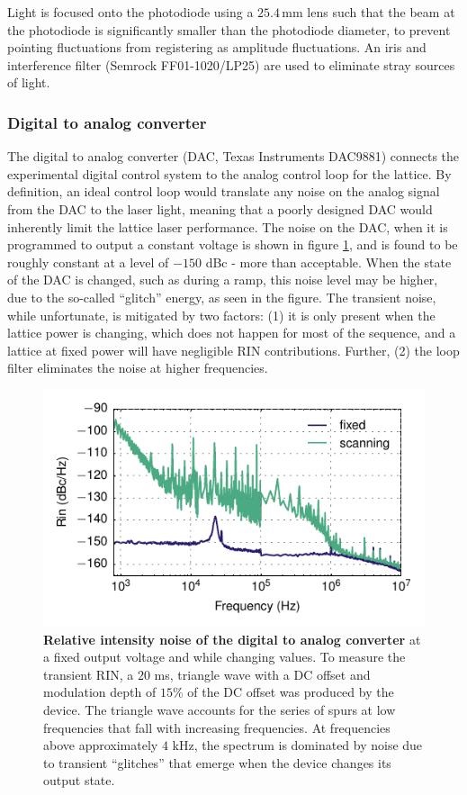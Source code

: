 \documentclass[twocolumn,aps,pra,showpacs,preprintnumbers,bibnotes]{revtex4-1}
\begin{document}
Light is focused onto the photodiode using a $25.4\,$mm lens such that the beam at the photodiode is significantly smaller than the photodiode diameter, to prevent pointing fluctuations from registering as amplitude fluctuations. 
An iris and interference filter (Semrock FF01-1020/LP25) are used to eliminate stray sources of light. 


\subsubsection{Digital to analog converter}
The digital to analog converter (DAC, Texas Instruments DAC9881) connects the experimental digital control system to the analog control loop for the lattice. 
By definition, an ideal control loop would translate any noise on the analog signal from the DAC to the laser light, meaning that a poorly designed DAC would inherently limit the lattice laser performance.
The noise on the DAC, when it is programmed to output a constant voltage is shown in figure \ref{fig:da_rin}, and is found to be roughly constant at a level of $-150$ dBc - more than acceptable.
When the state of the DAC is changed, such as during a ramp, this noise level may be higher, due to the so-called ``glitch'' energy, as seen in the figure.
The transient noise, while unfortunate, is mitigated by two factors: (1) it is only present when the lattice power is changing, which does not happen for most of the sequence, and a lattice at fixed power will have negligible RIN contributions. Further, (2) the loop filter eliminates the noise at higher frequencies. 

\begin{figure}
  \begin{center}
    \includegraphics{fig/da_rin_scan.pdf}
    \caption{\textbf{Relative intensity noise of the digital to analog converter} at a fixed output voltage and while changing values. To measure the transient RIN, a $20$ ms, triangle wave with a DC offset and modulation depth of $15$\% of the DC offset was produced by the device. The triangle wave accounts for the series of spurs at low frequencies that fall with increasing frequencies. At frequencies above approximately $4$ kHz, the spectrum is dominated by noise due to transient ``glitches'' that emerge when the device changes its output state.}\label{fig:da_rin}
  \end{center}
\end{figure}
\end{document}
